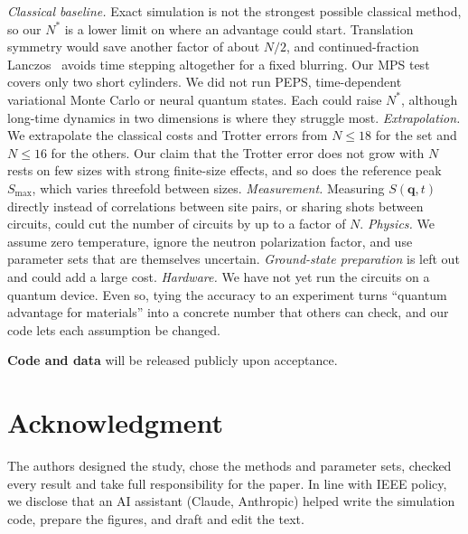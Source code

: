 \documentclass[conference]{IEEEtran}
\begin{document}
\emph{Classical baseline.} Exact simulation is not the strongest possible
classical method, so our $N^*$ is a lower limit on where an advantage could
start. Translation symmetry would save another factor of about $N/2$, and
continued-fraction Lanczos~\cite{gagliano1987} avoids time stepping
altogether for a fixed blurring. Our MPS test covers only two short
cylinders. We did not run PEPS, time-dependent variational Monte Carlo or
neural quantum states. Each could raise $N^*$, although long-time dynamics in two
dimensions is where they struggle most. \emph{Extrapolation.} We
extrapolate the classical costs and Trotter errors from $N\le18$ for the
\mainSet{} set and $N\le16$ for the others. Our claim that the Trotter error
does not grow with $N$ rests on few sizes with strong finite-size effects,
and so does the reference peak $S_{\max}$, which varies threefold between
sizes. \emph{Measurement.} Measuring $S(\mathbf q,t)$ directly instead of
correlations between site pairs, or sharing shots between circuits, could
cut the number of circuits by up to a factor of $N$. \emph{Physics.} We
assume zero temperature, ignore the neutron polarization factor, and use
parameter sets that are themselves uncertain. \emph{Ground-state
preparation} is left out and could add a large cost. \emph{Hardware.} We
have not yet run the circuits on a quantum device. Even so,
tying the accuracy to an experiment turns ``quantum advantage for
materials'' into a concrete number that others can check, and our code
lets each assumption be changed.

\textbf{Code and data} will be released publicly upon acceptance.

\section*{Acknowledgment}
The authors designed the study, chose the methods and parameter sets,
checked every result and take full responsibility for the paper. In line
with IEEE policy, we disclose that an AI assistant (Claude, Anthropic)
helped write the simulation code, prepare the figures, and draft and edit
the text.



\end{document}
